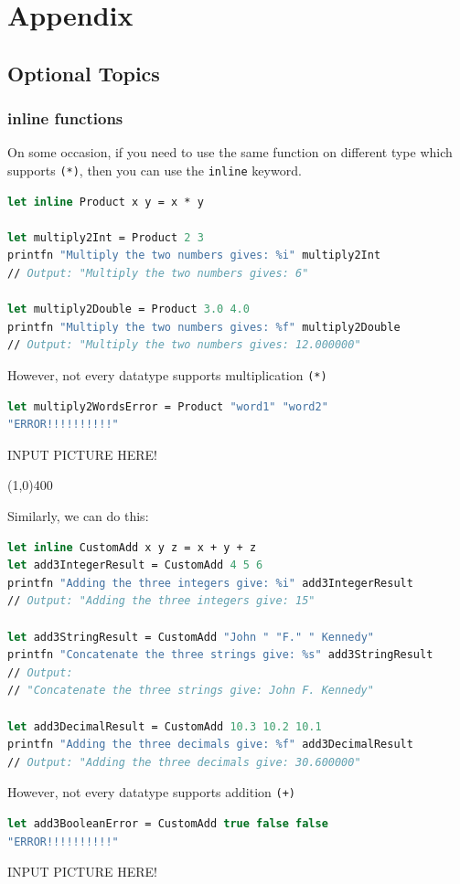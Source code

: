 \documentclass[12pt]{article}
\begin{document}
\pagebreak

\appendix
\section{Appendix}

\subsection{Optional Topics}
\subsubsection{inline functions}
On some occasion, if you need to use the same function on different type which supports \texttt{(*)}, then you can use the \texttt{inline} keyword.
\begin{lstlisting}[language=FSharp]
let inline Product x y = x * y

let multiply2Int = Product 2 3
printfn "Multiply the two numbers gives: %i" multiply2Int
// Output: "Multiply the two numbers gives: 6"

let multiply2Double = Product 3.0 4.0
printfn "Multiply the two numbers gives: %f" multiply2Double
// Output: "Multiply the two numbers gives: 12.000000"
\end{lstlisting}
However, not every datatype supports multiplication \texttt{(*)}

\begin{lstlisting}[language=FSharp]
let multiply2WordsError = Product "word1" "word2"
"ERROR!!!!!!!!!!"
\end{lstlisting}
\begin{center}
INPUT PICTURE HERE!
\end{center}
\begin{center}
\line(1,0){400}
\end{center}
Similarly, we can do this:
\begin{lstlisting}[language=FSharp]
let inline CustomAdd x y z = x + y + z
let add3IntegerResult = CustomAdd 4 5 6
printfn "Adding the three integers give: %i" add3IntegerResult
// Output: "Adding the three integers give: 15"

let add3StringResult = CustomAdd "John " "F." " Kennedy"
printfn "Concatenate the three strings give: %s" add3StringResult
// Output:
// "Concatenate the three strings give: John F. Kennedy"

let add3DecimalResult = CustomAdd 10.3 10.2 10.1
printfn "Adding the three decimals give: %f" add3DecimalResult
// Output: "Adding the three decimals give: 30.600000"
\end{lstlisting}
However, not every datatype supports addition \texttt{(+)}
\begin{lstlisting}[language=FSharp]
let add3BooleanError = CustomAdd true false false
"ERROR!!!!!!!!!!"
\end{lstlisting}
\begin{center}
INPUT PICTURE HERE!
\end{center}
\end{document}
